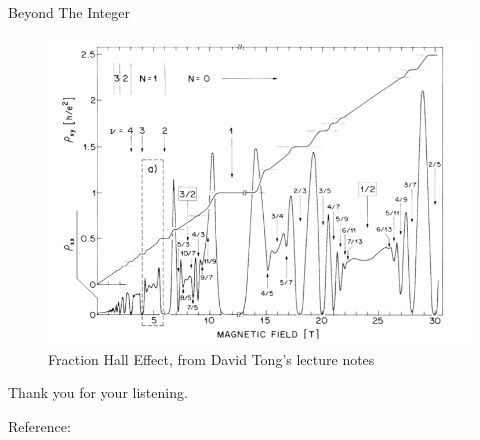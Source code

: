 \documentclass{beamer}
\begin{document}
\begin{frame}{Beyond The Integer}
	\begin{figure}
\includegraphics[width =0.7\linewidth]{images/FQH.png}
\begin{center}
	\caption{Fraction Hall Effect, from David Tong's lecture notes}
\end{center}
	\end{figure}
\end{frame}
\begin{frame}[c]
	\begin{center}
Thank you for your listening.
	\end{center}
\end{frame}
\begin{frame}
Reference:
\printbibliography
\end{frame}
\end{document}
